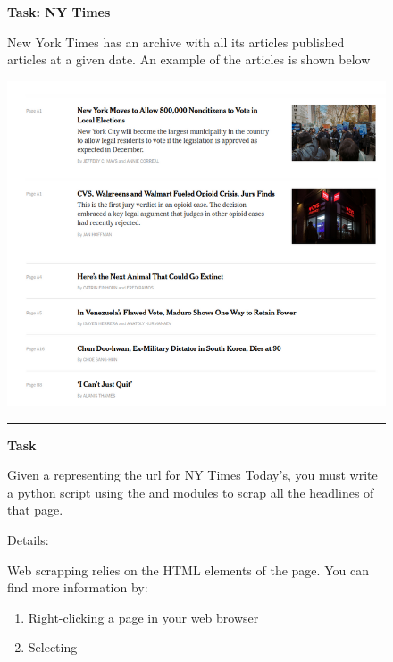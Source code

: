

\begin{figure}
\begin{mdframed}[backgroundcolor=gray!05] 
\begin{scriptsize}

{\large \textbf{Task: NY Times}} \bigskip


New York Times has an archive with all its articles published articles at a given date. An example of the articles is shown below

\medskip

\includegraphics[width=\textwidth]{appendix/cp6/rsz_nytimes.png}

\medskip

\begin{center}
\rule{10cm}{0.4pt}
\end{center}

\textbf{Task} \medskip



Given a  representing the url for NY Times Today's, you must write a python script using the  and  modules to scrap all the headlines of that page. \medskip



Details:\medskip


Web scrapping relies on the HTML elements of the page. You can find more information by:

\begin{enumerate}


    \item  Right-clicking a page in your web browser

    \item  Selecting 


\end{enumerate}

\end{scriptsize}
\end{mdframed}
\end{figure}
  


